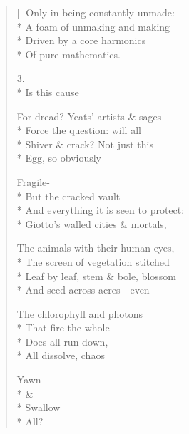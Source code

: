 \begin{verse}[\versewidth]
Only in being constantly unmade:\\*
A foam of unmaking and making\\*
Driven by a core harmonics\\*
Of pure mathematics.

3.\\*
\hspace{3\vgap}  Is this cause

For dread? Yeats' artists \& sages\\*
Force the question: will all\\*
Shiver \& crack?  Not just this \\*
Egg, so obviously

Fragile-\\*
But the cracked vault\\*
And everything it is seen to protect:\\*
Giotto's walled cities \& mortals,

The animals with their human eyes,\\*
The screen of vegetation stitched\\*
Leaf by leaf, stem \& bole, blossom\\*
And seed across acres---even 

The chlorophyll and photons\\*
That fire the whole-\\*
Does all run down,\\*
All dissolve, chaos

Yawn\\*
\& \\*
Swallow\\*
All?
\end{verse}
